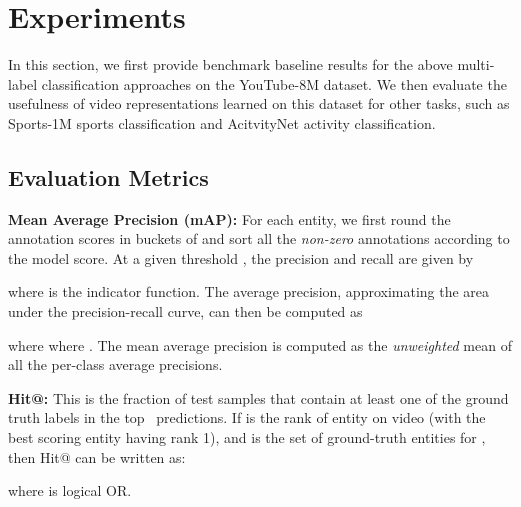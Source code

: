 \documentclass{sig-alternate-05-2015}
\begin{document}
\section{Experiments}
\label{sec:experiments}
In this section, we first provide benchmark baseline results for the above multi-label classification approaches on the YouTube-8M dataset.
We then evaluate the usefulness of video representations learned on this dataset for other tasks, such as Sports-1M sports classification and AcitvityNet activity classification.

\subsection{Evaluation Metrics}
\textbf{Mean Average Precision (mAP):} For each entity, we first round the annotation scores in buckets of   and sort all the \textit{non-zero} annotations according to the model score. At a given threshold , the precision  and recall  are given by


where  is the indicator function. The average precision, approximating the area under the precision-recall curve, can then be computed as

where where . The mean average precision is computed as the \textit{unweighted} mean of all the per-class average precisions.

\textbf{Hit@:} This is the fraction of test samples that contain at least one of the ground truth labels in the top~ predictions. If  is the rank of entity  on video  (with the best scoring entity having rank 1), and  is the set of ground-truth entities for , then Hit@ can be written as:

where  is logical OR.
\end{document}
